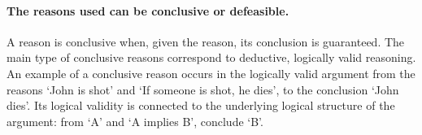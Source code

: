 \documentclass[10pt]{article}
\begin{document}
\paragraph{The reasons used can be conclusive or 
defeasible.} A reason is conclusive when, given  the reason, its conclusion is guaranteed. The main type of conclusive reasons correspond to 
deductive, logically valid reasoning. 
An example of a conclusive reason occurs in the logically valid argument from the reasons `John is shot' and `If someone is shot, he dies', to 
the conclusion `John dies'. 
Its logical validity is connected to the underlying logical structure of the argument: 
from `A' and `A implies B', conclude `B'. 
\end{document}
